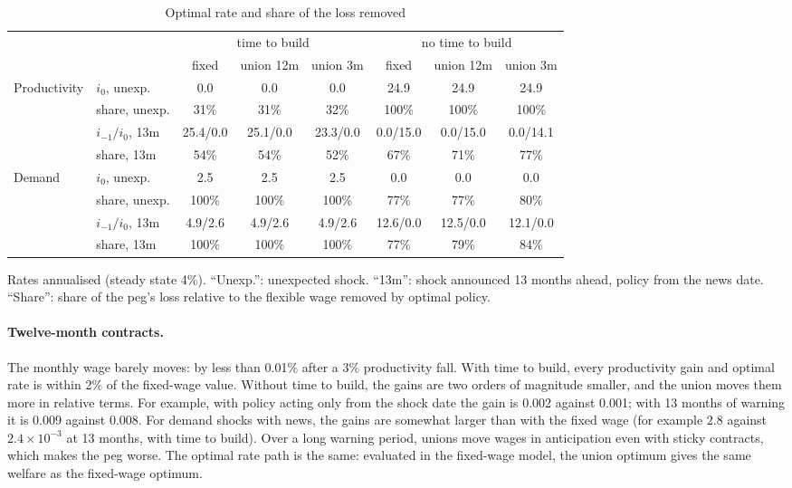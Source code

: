 \documentclass[11pt]{article}
\begin{document}
\begin{table}[h]
  \centering
  \caption{Optimal rate and share of the loss removed}\label{tab:impact}
  \footnotesize\setlength{\tabcolsep}{3.5pt}
  \begin{tabular}{llcccccc}
    \toprule
    & & \multicolumn{3}{c}{time to build} & \multicolumn{3}{c}{no time to build} \\
    \cmidrule(lr){3-5}\cmidrule(lr){6-8}
    & & fixed & union 12m & union 3m & fixed & union 12m & union 3m \\
    \midrule
    Productivity & $i_0$, unexp. & 0.0 & 0.0 & 0.0 & 24.9 & 24.9 & 24.9 \\
    & share, unexp. & 31\% & 31\% & 32\% & 100\% & 100\% & 100\% \\
    & $i_{-1}/i_0$, 13m & 25.4/0.0 & 25.1/0.0 & 23.3/0.0 & 0.0/15.0 & 0.0/15.0 & 0.0/14.1 \\
    & share, 13m & 54\% & 54\% & 52\% & 67\% & 71\% & 77\% \\
    \midrule
    Demand & $i_0$, unexp. & 2.5 & 2.5 & 2.5 & 0.0 & 0.0 & 0.0 \\
    & share, unexp. & 100\% & 100\% & 100\% & 77\% & 77\% & 80\% \\
    & $i_{-1}/i_0$, 13m & 4.9/2.6 & 4.9/2.6 & 4.9/2.6 & 12.6/0.0 & 12.5/0.0 & 12.1/0.0 \\
    & share, 13m & 100\% & 100\% & 100\% & 77\% & 79\% & 84\% \\
    \bottomrule
  \end{tabular}

  \medskip
  \parbox{0.95\textwidth}{\footnotesize Rates annualised (steady state 4\%). ``Unexp.'': unexpected
  shock. ``13m'': shock announced 13 months ahead, policy from the news date. ``Share'': share of the
  peg's loss relative to the flexible wage removed by optimal policy.}
\end{table}

\paragraph{Twelve-month contracts.} The monthly wage barely moves: by less than 0.01\% after a 3\%
productivity fall. With time to build, every productivity gain and optimal rate is within 2\% of the
fixed-wage value. Without time to build, the gains are two orders of magnitude smaller, and the union
moves them more in relative terms. For example, with policy acting only from the shock date the gain is
0.002 against 0.001; with 13 months of warning it is 0.009 against 0.008. For demand shocks with news,
the gains are somewhat larger than with the fixed wage (for example $2.8$ against $2.4\times10^{-3}$ at
13 months, with time to build). Over a long warning period, unions move
wages in anticipation even with sticky contracts, which makes the peg worse. The optimal rate path is
the same: evaluated in the fixed-wage model, the union optimum gives the same welfare as the
fixed-wage optimum.
\end{document}
